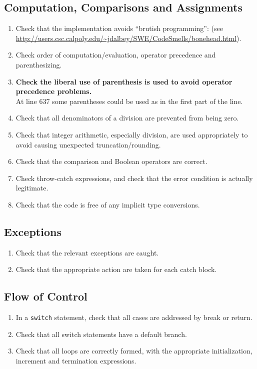 \documentclass[a4paper,11pt]{report} %
\begin{document}
		\subsection*{Computation, Comparisons and Assignments}\begin{enumerate}[resume]
			\item Check that the implementation avoids ``brutish programming'': (see \url{http://users.csc.calpoly.edu/~jdalbey/SWE/CodeSmells/bonehead.html}). 
			\item Check order of computation/evaluation, operator precedence and parenthesizing.
			\item \textbf{Check the liberal use of parenthesis is used to avoid operator precedence problems.}\smallskip \\
				At line 637 some parentheses could be used as in the first part of the line.
				
			\item Check that all denominators of a division are prevented from being zero.
			\item Check that integer arithmetic, especially division, are used appropriately to avoid causing unexpected truncation/rounding.
			\item Check that the comparison and Boolean operators are correct.
			\item Check throw-catch expressions, and check that the error condition is actually legitimate.
			\item Check that the code is free of any implicit type conversions.
		\end{enumerate}
		
		\subsection*{Exceptions}\begin{enumerate}[resume]
			\item Check that the relevant exceptions are caught.
			\item Check that the appropriate action are taken for each catch block.
		\end{enumerate}
		
		\subsection*{Flow of Control}\begin{enumerate}[resume]
			\item In a \texttt{switch} statement, check that all cases are addressed by break or return.
			\item Check that all switch statements have a default branch.
			\item Check that all loops are correctly formed, with the appropriate initialization, increment and termination expressions.
		\end{enumerate}
		
\end{document}

